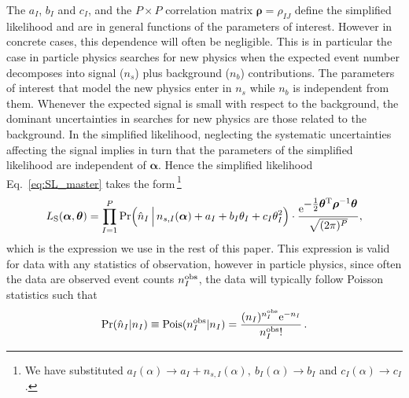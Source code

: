 \documentclass[11pt]{article}
\newcommand{\be}{\begin{equation}}
\newcommand{\ee}{\end{equation}}
\begin{document}
The $a_I$, $b_I$ and $c_I$, and the $P\times P$ correlation matrix $\bm{\rho}=\rho_{IJ}$ define the simplified likelihood and are in general functions of the parameters of interest. However in concrete cases, this dependence will often be negligible. This is in particular the case in particle physics searches for new physics when the expected event number decomposes into signal ($n_s$) plus background ($n_b$) contributions. The parameters of interest that model the new physics enter in $n_s$ while $n_b$ is independent from them.  Whenever the expected signal is small with respect to the background, the dominant uncertainties in searches for new physics are those related to the background.
In the simplified likelihood, neglecting the systematic uncertainties affecting the signal implies in turn that the parameters of the simplified likelihood are independent of $\bm \alpha$. Hence the simplified likelihood Eq.~\eqref{eq:SL_master} takes the form\,\footnote{We have substituted
$a_I(\alpha)\rightarrow a_I+n_{s,I}(\alpha),~b_I(\alpha)\rightarrow b_I$ and $c_I(\alpha)\rightarrow c_I$.}
\begin{equation}
 L_{\rm{S}}(\bm{\alpha},\bm{\theta})=
\prod_{I=1}^P \mathrm{Pr}\Big( \hat{n}_I \, \Big| \, n_{s,I}(\bm{\alpha})+a_I+ b_I\theta_I+c_I\theta_I^2  \Big) \cdot
\frac{ \mathrm{e}^{ \textstyle-\frac{1}{2}\bm{\theta}^\mathrm{T} \bm{\rho}^{-1} \bm{\theta} }}{\sqrt{(2\pi)^P}},
\label{eq:SL_LHC}
\end{equation}
which is the expression we use in the rest of this paper. This expression is valid for data with any statistics of observation, however in particle physics, since often the data
are observed event counts $n_{I}^{\rm{obs}}$, the data will typically follow Poisson statistics such that
\be
\textrm{Pr}(\hat{n}_{I}|n_{I})\equiv \textrm{Pois}({n}^{\rm{obs}}_{I}|n_{I}) = \dfrac{(n_{I})^{{n}^{\rm{obs}}_{I}} \mathrm{e}^{-n_{I}}}{{n}^{\rm{obs}}_{I}!} \, .
\ee
\end{document}
